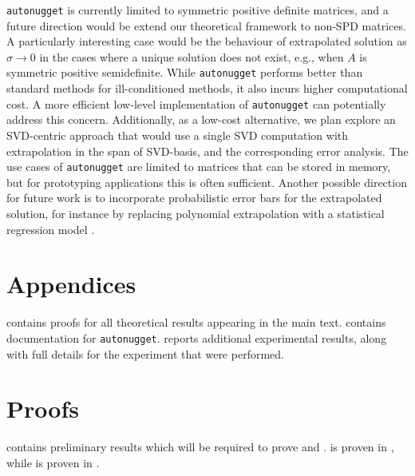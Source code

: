 \documentclass[10pt]{article} %
\newcommand{\nugget}{\sigma}
\begin{document}
\texttt{autonugget} is currently limited to symmetric positive definite matrices, and a future direction would be extend our theoretical framework to non-SPD matrices. A particularly interesting case would be the behaviour of extrapolated solution as $\nugget \rightarrow 0$ in the cases where a unique solution does not exist, e.g., when $A$ is symmetric positive semidefinite. While \texttt{autonugget} performs better than standard methods for ill-conditioned methods, it also incurs higher computational cost. A more efficient low-level implementation of \texttt{autonugget} can potentially address this concern. Additionally, as a low-cost alternative, we plan explore an SVD-centric approach that would use a single SVD computation with extrapolation in the span of SVD-basis, and the corresponding error analysis. 
The use cases of \texttt{autonugget} are limited to matrices that can be stored in memory, but for prototyping applications this is often sufficient.
Another possible direction for future work is to incorporate probabilistic error bars for the extrapolated solution, for instance by replacing polynomial extrapolation with a statistical regression model \citep{oates2025probabilistic}.







\newpage
\appendix

\section*{Appendices}
\thispagestyle{empty}

 contains proofs for all theoretical results appearing in the main text.
 contains documentation for \texttt{autonugget}.
 reports additional experimental results, along with full details for the experiment that were performed.

\section{Proofs}
\label{app: proofs}
 contains preliminary results which will be required to prove  and .
 is proven in , while  is proven in .
\end{document}
